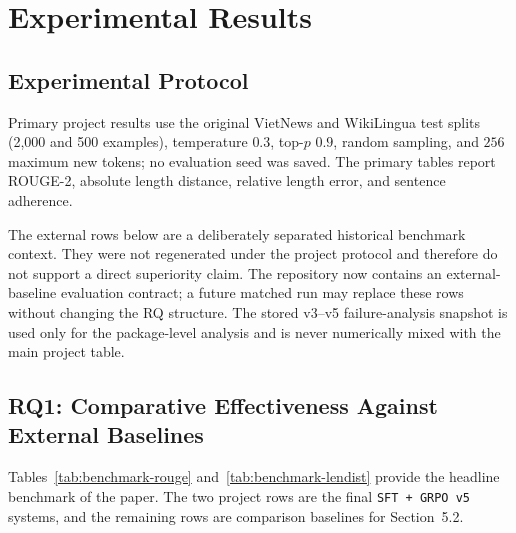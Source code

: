 \documentclass[11pt]{article}
\begin{document}
\section{Experimental Results}
\subsection{Experimental Protocol}
Primary project results use the original VietNews and WikiLingua test splits (2,000 and 500 examples), temperature $0.3$, top-$p$ $0.9$, random sampling, and $256$ maximum new tokens; no evaluation seed was saved. The primary tables report ROUGE-2, absolute length distance, relative length error, and sentence adherence.

The external rows below are a deliberately separated historical benchmark context. They were not regenerated under the project protocol and therefore do not support a direct superiority claim. The repository now contains an external-baseline evaluation contract; a future matched run may replace these rows without changing the RQ structure. The stored v3--v5 failure-analysis snapshot is used only for the package-level analysis and is never numerically mixed with the main project table.

\subsection{RQ1: Comparative Effectiveness Against External Baselines}
Tables~\ref{tab:benchmark-rouge} and~\ref{tab:benchmark-lendist} provide the headline benchmark of the paper.
The two project rows are the final \texttt{SFT + GRPO v5} systems, and the remaining rows are comparison baselines for Section~5.2.
\end{document}
